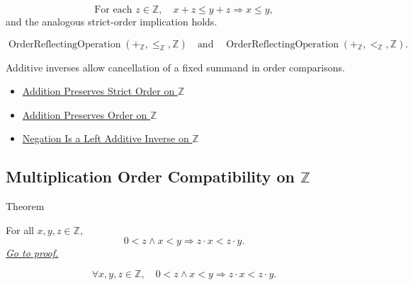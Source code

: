 \begin{remark*}
\[
\text{For each }z\in\mathbb{Z},\quad
x+z\le y+z \Longrightarrow x\le y,
\]
and the analogous strict-order implication holds.
\end{remark*}

\begin{remark*}
\[
\operatorname{OrderReflectingOperation}(+_{\mathbb{Z}},\le_{\mathbb{Z}},\mathbb{Z})
\quad\text{and}\quad
\operatorname{OrderReflectingOperation}(+_{\mathbb{Z}},<_{\mathbb{Z}},\mathbb{Z}).
\]
\end{remark*}

\begin{remark*}[Interpretation]
Additive inverses allow cancellation of a fixed summand in order comparisons.
\end{remark*}

\begin{dependencies}
\begin{itemize}
  \item \hyperref[thm:addition-preserves-strict-order-on-z]{Addition Preserves Strict Order on $\mathbb{Z}$}
  \item \hyperref[thm:addition-preserves-order-on-z]{Addition Preserves Order on $\mathbb{Z}$}
  \item \hyperref[thm:negation-left-additive-inverse-on-z]{Negation Is a Left Additive Inverse on $\mathbb{Z}$}
\end{itemize}
\end{dependencies}

\subsection*{\texorpdfstring{Multiplication Order Compatibility on $\mathbb{Z}$}{Multiplication Order Compatibility on Z}}

\begin{theorembox}{Theorem}
\begin{theorem}
\label{thm:left-positive-multiplication-preserves-strict-order-on-z}
For all $x,y,z\in\mathbb{Z}$,
\[
0<z\land x<y \Longrightarrow z\cdot x<z\cdot y.
\]
\hyperref[prf:left-positive-multiplication-preserves-strict-order-on-z]{\textit{Go to proof.}}
\end{theorem}
\end{theorembox}

\begin{remark*}
\[
\forall x,y,z\in\mathbb{Z},\quad
0<z\land x<y \Longrightarrow z\cdot x<z\cdot y.
\]
\end{remark*}

